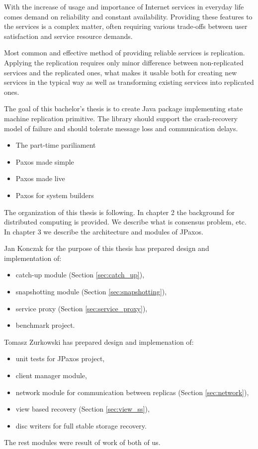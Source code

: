 
With the increase of usage and importance of Internet services in everyday life comes demand on reliability and constant availability.
Providing these features to the services is a complex matter, often requiring various trade-offs between user satisfaction and service resource demands.

Most common and effective method of providing reliable services is replication. Applying the replication requires only minor difference between non-replicated services and the replicated ones, what makes it usable both for creating new services in the typical way %
as well as transforming existing services into replicated ones.

The goal of this bachelor's thesis is to create Java package implementing state machine replication primitive. The library should support the crash-recovery model of failure and should tolerate message loss and communication delays.
 
\begin{itemize}
  \item The part-time pariliament
  \item Paxos made simple
  \item Paxos made live
  \item Paxos for system builders
\end{itemize}

The organization of this thesis is following. In chapter 2 the background for distributed computing is provided. We describe what is consensus problem, etc. In chapter 3 we describe the architecture and modules of JPaxos.

Jan Konczak for the purpose of this thesis has prepared design and implementation of:
\begin{itemize}
  \item catch-up module (Section \ref{sec:catch_up}),
  \item snapshotting module (Section \ref{sec:snapshotting}),
  \item service proxy (Section \ref{sec:service_proxy}),
  \item benchmark project.
\end{itemize}

Tomasz Zurkowski has prepared design and implemenation of:
\begin{itemize}
  \item unit tests for JPaxos project,
  \item client manager module, 
  \item network module for communication between replicas (Section \ref{sec:network}),
  \item view based recovery (Section \ref{sec:view_ss}),
  \item disc writers for full stable storage recovery.
\end{itemize}

The rest modules were result of work of both of us.
